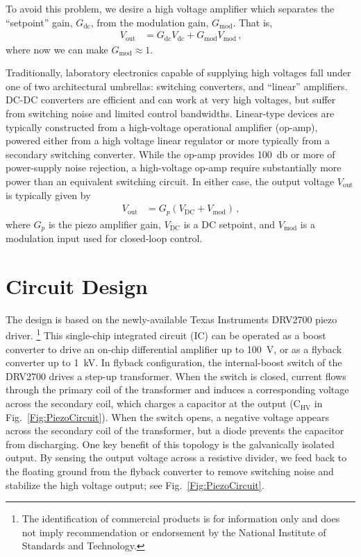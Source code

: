 \documentclass[aip,rsi,reprint]{revtex4-1} %
\begin{document}
To avoid this problem, we desire a high voltage amplifier which separates the ``setpoint'' gain, $G_{\text{dc}}$, from the modulation gain, $G_{\text{mod}}$. That is,
\begin{align}
  V_{\text{out}} &= G_{\text{dc}} V_{\text{dc}} + G_{\text{mod}} V_{\text{mod}}\, \text{,}
  \label{Eq:PiezoTransfer}
\end{align}
where now we can make $G_{\text{mod}} \approx 1$.

Traditionally, laboratory electronics capable of supplying high voltages fall under one of two architectural umbrellas: switching converters, and ``linear'' amplifiers.
DC-DC converters are efficient and can work at very high voltages, but suffer from switching noise and limited control bandwidths.
Linear-type devices are typically constructed from a high-voltage operational amplifier (op-amp), powered either from a high voltage linear regulator or more typically from a secondary switching converter.
While the op-amp provides \SI{100}{\decibel} or more of power-supply noise rejection, a high-voltage op-amp require substantially more power than an equivalent switching circuit.
In either case, the output voltage  $V_{\text{out}}$ is typically given by
\begin{align}
  V_{\text{out}} &= G_p(V_{\text{DC}} + V_{\text{mod}})\, \text{,}
\end{align}
where $G_p$ is the piezo amplifier gain, $V_{\text{DC}}$ is a DC setpoint, and $V_{\text{mod}}$ is a modulation input used for closed-loop control.


\section{Circuit Design}
\label{Sec:Circuit}

The design is based on the newly-available Texas Instruments DRV2700 piezo driver.
\footnote{The identification of commercial products is for information only and does not imply recommendation or endorsement by the National Institute of Standards and Technology.}
This single-chip integrated circuit (IC) can be operated as a boost converter to drive an on-chip differential amplifier up to \SI{100}{\volt}, or as a flyback converter up to \SI{1}{\kilo\volt}.
In flyback configuration, the internal-boost switch of the DRV2700 drives a step-up transformer.
When the switch is closed, current flows through the primary coil of the transformer and induces a corresponding voltage across the secondary coil, which charges a capacitor at the output ($\text{C}_{\text{HV}}$ in Fig.~\ref{Fig:PiezoCircuit}).
When the switch opens, a negative voltage appears across the secondary coil of the transformer, but a diode prevents the capacitor from discharging.
One key benefit of this topology is the galvanically isolated output.
By sensing the output voltage across a resistive divider, we feed back to the floating ground from the flyback converter to remove switching noise and stabilize the high voltage output; see Fig.~\ref{Fig:PiezoCircuit}.
\end{document}
